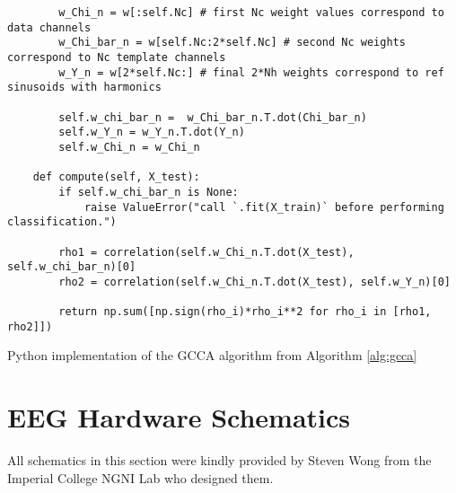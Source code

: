 \begin{listing}[h]
\begin{verbatim}
        w_Chi_n = w[:self.Nc] # first Nc weight values correspond to data channels
        w_Chi_bar_n = w[self.Nc:2*self.Nc] # second Nc weights correspond to Nc template channels
        w_Y_n = w[2*self.Nc:] # final 2*Nh weights correspond to ref sinusoids with harmonics
        
        self.w_chi_bar_n =  w_Chi_bar_n.T.dot(Chi_bar_n)
        self.w_Y_n = w_Y_n.T.dot(Y_n)
        self.w_Chi_n = w_Chi_n
            
    def compute(self, X_test):
        if self.w_chi_bar_n is None:
            raise ValueError("call `.fit(X_train)` before performing classification.")

        rho1 = correlation(self.w_Chi_n.T.dot(X_test), self.w_chi_bar_n)[0]
        rho2 = correlation(self.w_Chi_n.T.dot(X_test), self.w_Y_n)[0]

        return np.sum([np.sign(rho_i)*rho_i**2 for rho_i in [rho1, rho2]])

\end{verbatim}
\caption{Python implementation of the GCCA algorithm from Algorithm \ref{alg:gcca}}
\label{app-listing:gcca-algo}
\end{listing}


\section{EEG Hardware Schematics}
All schematics in this section were kindly provided by Steven Wong from the Imperial College NGNI Lab who designed them.
\label{appendix:schematics}

